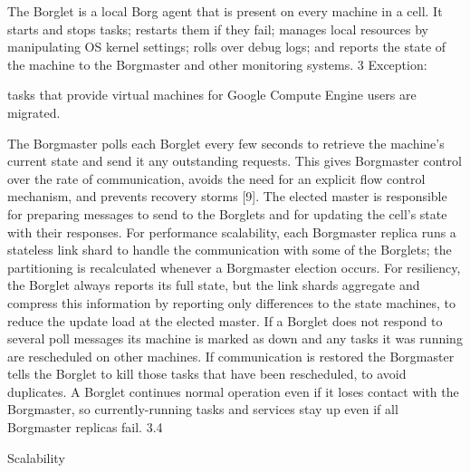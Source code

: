 The Borglet is a local Borg agent that is present on every
machine in a cell. It starts and stops tasks; restarts them if
they fail; manages local resources by manipulating OS kernel settings; rolls over debug logs; and reports the state of the
machine to the Borgmaster and other monitoring systems.
3 Exception:

tasks that provide virtual machines for Google Compute Engine users are migrated.

The Borgmaster polls each Borglet every few seconds to
retrieve the machine’s current state and send it any outstanding requests. This gives Borgmaster control over the rate of
communication, avoids the need for an explicit flow control
mechanism, and prevents recovery storms [9].
The elected master is responsible for preparing messages
to send to the Borglets and for updating the cell’s state with
their responses. For performance scalability, each Borgmaster replica runs a stateless link shard to handle the communication with some of the Borglets; the partitioning is recalculated whenever a Borgmaster election occurs. For resiliency,
the Borglet always reports its full state, but the link shards
aggregate and compress this information by reporting only
differences to the state machines, to reduce the update load
at the elected master.
If a Borglet does not respond to several poll messages its
machine is marked as down and any tasks it was running
are rescheduled on other machines. If communication is
restored the Borgmaster tells the Borglet to kill those tasks
that have been rescheduled, to avoid duplicates. A Borglet
continues normal operation even if it loses contact with the
Borgmaster, so currently-running tasks and services stay up
even if all Borgmaster replicas fail.
3.4

Scalability

